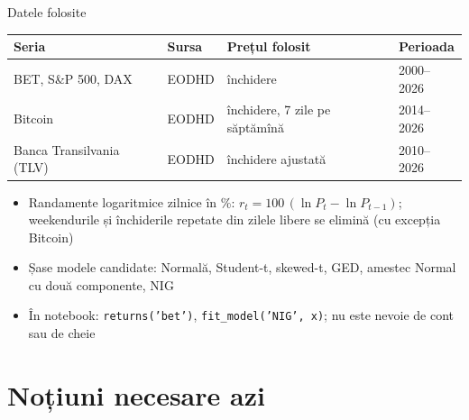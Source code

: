 \begin{frame}{Datele folosite}
\itemsize{\small}
\begin{center}
\footnotesize
\begin{tabular}{llll}
\toprule
\textbf{Seria} & \textbf{Sursa} & \textbf{Prețul folosit} & \textbf{Perioada} \\
\midrule
BET, S\&P 500, DAX & EODHD & închidere & 2000--2026 \\
Bitcoin & EODHD & închidere, 7 zile pe săptămînă & 2014--2026 \\
Banca Transilvania (TLV) & EODHD & închidere ajustată & 2010--2026 \\
\bottomrule
\end{tabular}
\end{center}
\begin{itemize}
    \item Randamente logaritmice zilnice în \%: $r_t = 100\,(\ln P_t - \ln P_{t-1})$; weekendurile și închiderile repetate din zilele libere se elimină (cu excepția Bitcoin)
    \item Șase modele candidate: Normală, Student-t, skewed-t, GED, amestec Normal cu două componente, NIG
    \item În notebook: \texttt{returns('bet')}, \texttt{fit\_model('NIG', x)}; nu este nevoie de cont sau de cheie
\end{itemize}
\end{frame}


\section{Noțiuni necesare azi}

